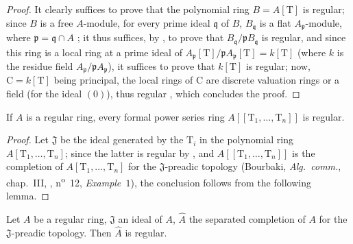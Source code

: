 \begin{proof}
It clearly suffices to prove that the polynomial ring $B=A[\mathrm{T}]$ is regular;
since $B$ is a free $A$-module, for every prime ideal $\mathfrak{q}$ of $B$, $B_\mathfrak{q}$ is a flat $A_\mathfrak{p}$-module, where $\mathfrak{p}=\mathfrak{q}\cap A$ ;
  it thus suffices, by , to prove that $B_\mathfrak{q}/\mathfrak{p}B_\mathfrak{q}$ is regular, and since this ring is a local ring at a prime ideal of $A_\mathfrak{p}[\mathrm{T}]/\mathfrak{p}A_\mathfrak{p}[\mathrm{T}]=k[\mathrm{T}]$ (where $k$ is the residue field $A_\mathfrak{p}/\mathfrak{p}A_\mathfrak{p}$), it suffices to prove that $k[\mathrm{T}]$ is regular;
now, $\mathrm{C}=k[\mathrm{T}]$ being principal, the local rings of $\mathrm{C}$ are discrete valuation rings or a field (for the ideal $(0)$), thus regular , which concludes the proof.
\end{proof}

\begin{corollary}[17.3.8]
\label{0.17.3.8}
If $A$ is a regular ring, every formal power series ring $A[[\mathrm{T}_1,\ldots,\mathrm{T}_n]]$ is regular.
\end{corollary}

\begin{proof}
Let $\mathfrak{J}$ be the ideal generated by the $\mathrm{T}_i$ in the polynomial ring $A[\mathrm{T}_1,\ldots,\mathrm{T}_n]$;
since the latter is regular by , and $A[[\mathrm{T}_1,\ldots,\mathrm{T}_n]]$ is the completion of $A[\mathrm{T}_1,\ldots,\mathrm{T}_n]$ for the $\mathfrak{J}$-preadic topology (Bourbaki, \emph{Alg.~comm.}, chap.~III, , n\textsuperscript{o}~12, \emph{Example~$1$}), the conclusion follows from the following lemma.
\end{proof}

\begin{lemma}[17.3.8.1]
\label{0.17.3.8.1}
Let $A$ be a regular ring, $\mathfrak{J}$ an ideal of $A$, $\widehat{A}$ the separated completion of $A$ for the $\mathfrak{J}$-preadic topology.
Then $\widehat{A}$ is regular.
\end{lemma}

